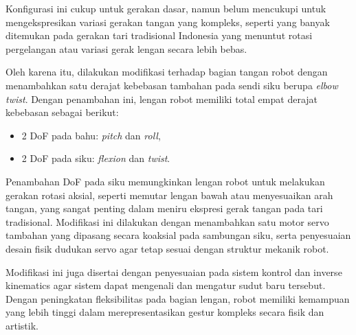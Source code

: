 Konfigurasi ini cukup untuk gerakan dasar, namun belum mencukupi untuk mengekspresikan variasi gerakan tangan yang kompleks, seperti yang banyak ditemukan pada gerakan tari tradisional Indonesia yang menuntut rotasi pergelangan atau variasi gerak lengan secara lebih bebas.

Oleh karena itu, dilakukan modifikasi terhadap bagian tangan robot dengan menambahkan satu derajat kebebasan tambahan pada sendi siku berupa \textit{elbow twist}. Dengan penambahan ini, lengan robot memiliki total empat derajat kebebasan sebagai berikut:
\begin{itemize}
    \item 2 DoF pada bahu: \textit{pitch} dan \textit{roll},
    \item 2 DoF pada siku: \textit{flexion} dan \textit{twist}.
\end{itemize}

Penambahan DoF pada siku memungkinkan lengan robot untuk melakukan gerakan rotasi aksial, seperti memutar lengan bawah atau menyesuaikan arah tangan, yang sangat penting dalam meniru ekspresi gerak tangan pada tari tradisional. Modifikasi ini dilakukan dengan menambahkan satu motor servo tambahan yang dipasang secara koaksial pada sambungan siku, serta penyesuaian desain fisik dudukan servo agar tetap sesuai dengan struktur mekanik robot.

Modifikasi ini juga disertai dengan penyesuaian pada sistem kontrol dan inverse kinematics agar sistem dapat mengenali dan mengatur sudut baru tersebut. Dengan peningkatan fleksibilitas pada bagian lengan, robot memiliki kemampuan yang lebih tinggi dalam merepresentasikan gestur kompleks secara fisik dan artistik.


